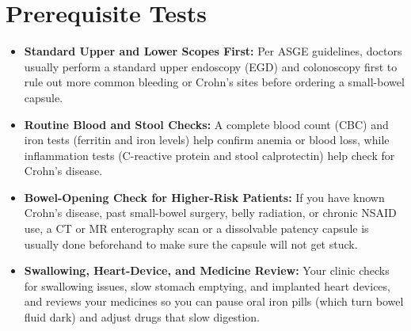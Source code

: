 \section{Prerequisite Tests}
\begin{itemize}
    \item \textbf{Standard Upper and Lower Scopes First:} Per ASGE guidelines, doctors usually perform a standard upper endoscopy (EGD) and colonoscopy first to rule out more common bleeding or Crohn's sites before ordering a small-bowel capsule.
    \item \textbf{Routine Blood and Stool Checks:} A complete blood count (CBC) and iron tests (ferritin and iron levels) help confirm anemia or blood loss, while inflammation tests (C-reactive protein and stool calprotectin) help check for Crohn's disease.
    \item \textbf{Bowel-Opening Check for Higher-Risk Patients:} If you have known Crohn's disease, past small-bowel surgery, belly radiation, or chronic NSAID use, a CT or MR enterography scan or a dissolvable patency capsule is usually done beforehand to make sure the capsule will not get stuck.
    \item \textbf{Swallowing, Heart-Device, and Medicine Review:} Your clinic checks for swallowing issues, slow stomach emptying, and implanted heart devices, and reviews your medicines so you can pause oral iron pills (which turn bowel fluid dark) and adjust drugs that slow digestion.
\end{itemize}

